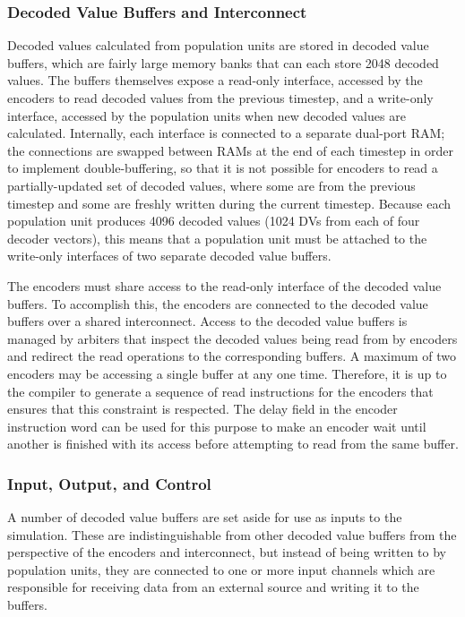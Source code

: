 \documentclass[english]{article}
\begin{document}
\subsubsection{Decoded Value Buffers and Interconnect}

Decoded values calculated from population units are stored in decoded value buffers, which are fairly large memory banks that can each
store 2048 decoded values. The buffers themselves expose a read-only interface, accessed by the encoders to read decoded values from the
previous timestep, and a write-only interface, accessed by the population units when new decoded values are calculated.
Internally, each interface is connected to a separate dual-port RAM; the connections are swapped between RAMs
at the end of each timestep in order to implement double-buffering, so that it is not possible for encoders to read a
partially-updated set of decoded values, where some are from the previous timestep and some are freshly written during the current timestep.
Because each population unit produces 4096 decoded values (1024 DVs from each of four decoder vectors),
this means that a population unit must be attached to the write-only interfaces of two separate decoded value buffers.

The encoders must share access to the read-only interface of the decoded value buffers. To accomplish this,
the encoders are connected to the decoded value buffers over a shared interconnect. Access to the decoded value buffers
is managed by arbiters that inspect the decoded values being read from by encoders and redirect the read operations to the
corresponding buffers. A maximum of two encoders may be accessing a single buffer at any one time.
Therefore, it is up to the compiler to generate a sequence of read instructions for the encoders that ensures that this
constraint is respected. The delay field in the encoder instruction word can be used for this purpose to make an encoder
wait until another is finished with its access before attempting to read from the same buffer.

\subsubsection{Input, Output, and Control}

A number of decoded value buffers are set aside for use as inputs to the simulation. These are indistinguishable from other decoded value buffers
from the perspective of the encoders and interconnect, but instead of being written to by population units,
they are connected to one or more input channels which are responsible for receiving data from an external source
and writing it to the buffers.
\end{document}
